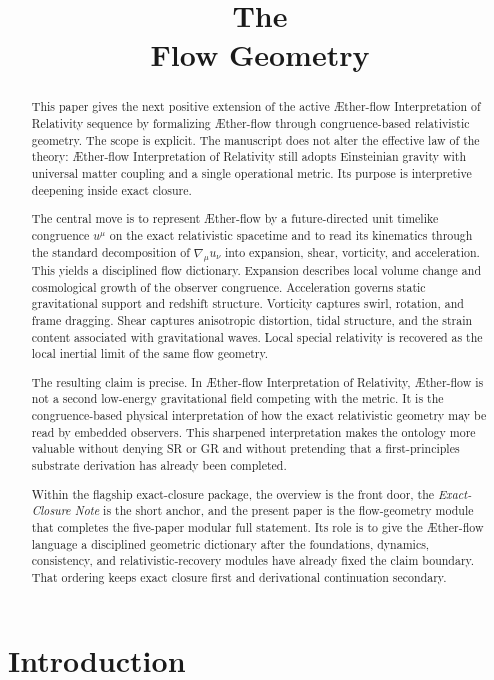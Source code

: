 \documentclass[11pt]{article}
\title{\textbf{The \TheoryName{}}\\[0.4em]
\large Flow Geometry}
\author{}
\date{}
\newcommand{\Aflow}{\AE{}ther-flow}
\newcommand{\TheoryName}{\Aflow{} Interpretation of Relativity}
\begin{document}
\maketitle

\begin{abstract}
This paper gives the next positive extension of the active \TheoryName{} sequence by formalizing \Aflow{} through congruence-based relativistic geometry. The scope is explicit. The manuscript does not alter the effective law of the theory: \TheoryName{} still adopts Einsteinian gravity with universal matter coupling and a single operational metric. Its purpose is interpretive deepening inside exact closure.

The central move is to represent \Aflow{} by a future-directed unit timelike congruence \(u^\mu\) on the exact relativistic spacetime and to read its kinematics through the standard decomposition of \(\nabla_\mu u_\nu\) into expansion, shear, vorticity, and acceleration. This yields a disciplined flow dictionary. Expansion describes local volume change and cosmological growth of the observer congruence. Acceleration governs static gravitational support and redshift structure. Vorticity captures swirl, rotation, and frame dragging. Shear captures anisotropic distortion, tidal structure, and the strain content associated with gravitational waves. Local special relativity is recovered as the local inertial limit of the same flow geometry.

The resulting claim is precise. In \TheoryName{}, \Aflow{} is not a second low-energy gravitational field competing with the metric. It is the congruence-based physical interpretation of how the exact relativistic geometry may be read by embedded observers. This sharpened interpretation makes the ontology more valuable without denying SR or GR and without pretending that a first-principles substrate derivation has already been completed.

Within the flagship exact-closure package, the overview is the front door, the \emph{Exact-Closure Note} is the short anchor, and the present paper is the flow-geometry module that completes the five-paper modular full statement. Its role is to give the \Aflow{} language a disciplined geometric dictionary after the foundations, dynamics, consistency, and relativistic-recovery modules have already fixed the claim boundary. That ordering keeps exact closure first and derivational continuation secondary.
\end{abstract}

\section{Introduction}
\end{document}
